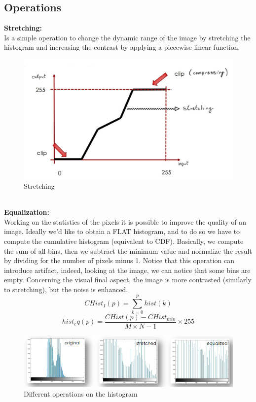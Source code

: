 \subsection{Operations}

\textbf{Stretching:}
\\Is a simple operation to change the dynamic range of the image by stretching the histogram and increasing the contrast by applying a piecewise linear function. 
\begin{figure}[h]
    \centering
    \includegraphics[scale=0.3]{Figures/Stretching.jpeg}
    \caption{Stretching}
    \label{fig:enter-label}
\end{figure}   
\\ 
\textbf{Equalization:}
\\Working on the statistics of the pixels it is possible to improve the quality of an image. Ideally we’d like to obtain a FLAT histogram, and to do so we have to compute the cumulative histogram (equivalent to CDF).
Basically, we compute the sum of all bins, then we subtract the minimum value and normalize the result by dividing for the number of pixels minus 1.
Notice that this operation can introduce artifact, indeed, looking at the image, we can notice that some bins are empty. Concerning the visual final aspect, the image is more contrasted (similarly to stretching), but the noise is enhanced.
    \[
        CHist_I(p) = \sum_{k=0}^{p} hist(k)
    \]
    \[
        hist_eq(p) = \frac{CHist(p)-CHist_{min}}{M \times N-1}\times 255
    \]
\begin{figure}[h]
    \centering
    \includegraphics[scale=0.5]{Figures/OperationsHist.png}
    \caption{Different operations on the histogram}
    \label{fig:enter-label}
\end{figure}
    
